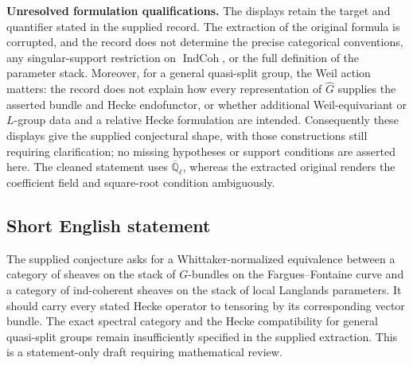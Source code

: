 \documentclass[11pt]{article}
\newcommand{\Q}{\mathbb{Q}}
\begin{document}
\textbf{Unresolved formulation qualifications.} The displays retain the target and quantifier stated in the supplied record. The extraction of the original formula is corrupted, and the record does not determine the precise categorical conventions, any singular-support restriction on \(\operatorname{IndCoh}\), or the full definition of the parameter stack. Moreover, for a general quasi-split group, the Weil action matters: the record does not explain how every representation of \(\widehat G\) supplies the asserted bundle and Hecke endofunctor, or whether additional Weil-equivariant or \(L\)-group data and a relative Hecke formulation are intended. Consequently these displays give the supplied conjectural shape, with those constructions still requiring clarification; no missing hypotheses or support conditions are asserted here. The cleaned statement uses \(\overline{\Q}_\ell\), whereas the extracted original renders the coefficient field and square-root condition ambiguously.
\subsection{Short English statement}
The supplied conjecture asks for a Whittaker-normalized equivalence between a category of sheaves on the stack of \(G\)-bundles on the Fargues--Fontaine curve and a category of ind-coherent sheaves on the stack of local Langlands parameters. It should carry every stated Hecke operator to tensoring by its corresponding vector bundle. The exact spectral category and the Hecke compatibility for general quasi-split groups remain insufficiently specified in the supplied extraction. This is a statement-only draft requiring mathematical review.
\end{document}
